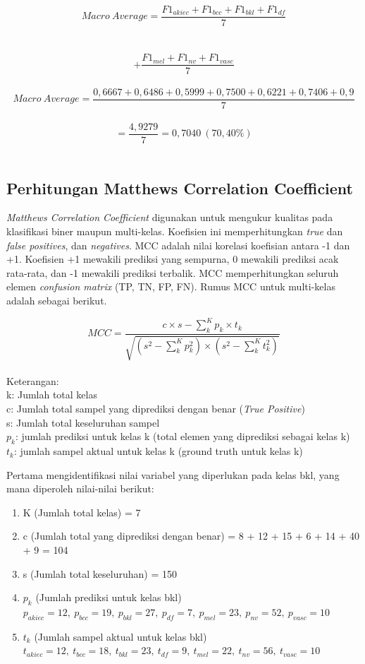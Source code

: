 $$Macro\ Average = \frac{F1_{akiec} + F1_{bcc} + F1_{bkl} + F1_{df}}{7}$$ \\ \\
$$+ \frac{F1_{mel} + F1_{nv} + F1_{vasc}}{7}$$ \\

$$Macro\ Average = \frac{0,6667 + 0,6486 + 0,5999 + 0,7500 + 0,6221 + 0,7406 + 0,9}{7}$$ \\
$$= \frac{4,9279}{7} = 0,7040\ (70,40\%)$$ \\

\subsection{Perhitungan Matthews Correlation Coefficient} \label{III.MCC}
\textit{Matthews Correlation Coefficient} digunakan untuk mengukur kualitas 
pada klasifikasi biner maupun multi-kelas. Koefisien ini memperhitungkan 
\textit{true} dan \textit{false positives}, dan \textit{negatives}. MCC 
adalah nilai korelasi koefisian antara -1 dan +1. Koefisien +1 mewakili 
prediksi yang sempurna, 0 mewakili prediksi acak rata-rata, dan -1 mewakili 
prediksi terbalik. MCC memperhitungkan seluruh elemen \textit{confusion matrix}
(TP, TN, FP, FN). Rumus MCC untuk multi-kelas adalah sebagai berikut. \par

$$MCC = \frac{c \times s - \sum_{k}^{K} p_k \times t_k}{\sqrt{(s^2 - \sum_{k}^{K} p_k^2) \times (s^2 - \sum_{k}^{K} t_k^2)}}$$ \\

\noindent Keterangan: \\
k: Jumlah total kelas \\ 
c: Jumlah total sampel yang diprediksi dengan benar (\textit{True Positive}) \\
s: Jumlah total keseluruhan sampel \\
$p_k$: jumlah prediksi untuk kelas k (total elemen yang diprediksi sebagai kelas k) \\
$t_k$: jumlah sampel aktual untuk kelas k (ground truth untuk kelas k) 

Pertama mengidentifikasi nilai variabel yang diperlukan pada kelas bkl, yang 
mana diperoleh nilai-nilai berikut: \par

\begin{enumerate}[noitemsep]
    \item K (Jumlah total kelas) = 7
    \item c (Jumlah total yang diprediksi dengan benar) = 8 + 12 + 15 + 6 + 14 + 40 + 9 = 104
    \item s (Jumlah total keseluruhan) = 150
    \item $p_{k}$ (Jumlah prediksi untuk kelas bkl) \\
    $p_{akiec}=12, \ p_{bcc}=19, \ p_{bkl}=27, \ p_{df}=7, \ p_{mel}=23, \ p_{nv}=52, \ p_{vasc}=10$
    \item $t_{k}$ (Jumlah sampel aktual untuk kelas bkl) \\
    $t_{akiec}=12, \ t_{bcc}=18, \ t_{bkl}=23, \ t_{df}=9, \ t_{mel}=22, \ t_{nv}=56, \ t_{vasc}=10$
\end{enumerate} \par

